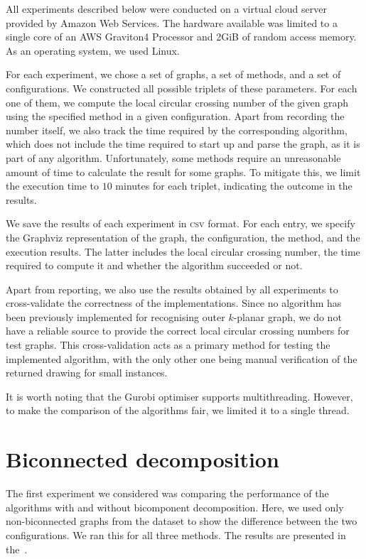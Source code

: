 All experiments described below were conducted on a virtual cloud server provided by Amazon Web Services. The hardware available was limited to a single core of an AWS Graviton4 Processor and 2GiB of random access memory. As an operating system, we used Linux.

For each experiment, we chose a set of graphs, a set of methods, and a set of configurations. We constructed all possible triplets of these parameters. For each one of them, we compute the local circular crossing number of the given graph using the specified method in a given configuration. Apart from recording the number itself, we also track the time required by the corresponding algorithm, which does not include the time required to start up and parse the graph, as it is part of any algorithm. Unfortunately, some methods require an unreasonable amount of time to calculate the result for some graphs. To mitigate this, we limit the execution time to \(10\) minutes for each triplet, indicating the outcome in the results.

We save the results of each experiment in \textsc{csv} format. For each entry, we specify the Graphviz representation of the graph, the configuration, the method, and the execution results. The latter includes the local circular crossing number, the time required to compute it and whether the algorithm succeeded or not.

Apart from reporting, we also use the results obtained by all experiments to cross-validate the correctness of the implementations. Since no algorithm has been previously implemented for recognising outer \(k\)-planar graph, we do not have a reliable source to provide the correct local circular crossing numbers for test graphs. This cross-validation acts as a primary method for testing the implemented algorithm, with the only other one being manual verification of the returned drawing for small instances.

It is worth noting that the Gurobi optimiser supports multithreading. However, to make the comparison of the algorithms fair, we limited it to a single thread.


\section{Biconnected decomposition}

The first experiment we considered was comparing the performance of the algorithms with and without bicomponent decomposition. Here, we used only non-biconnected graphs from the dataset to show the difference between the two configurations. We ran this for all three methods. The results are presented in the~.

